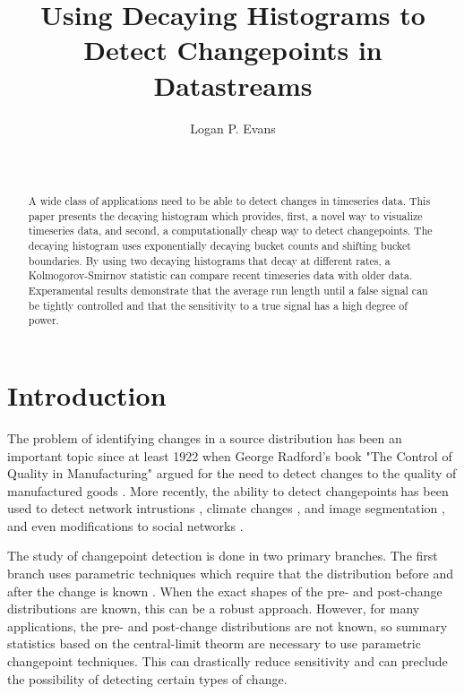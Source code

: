 \documentclass{sigkddExp}
\begin{document}
\title{Using Decaying Histograms to Detect Changepoints in Datastreams}


\author{
\alignauthor Logan P. Evans \\
       \\
       \\
}
\date{}
\maketitle
\begin{abstract}
    A wide class of applications need to be able to detect changes in timeseries
    data. This paper presents the decaying histogram which provides, first, a
    novel way to visualize timeseries data, and second, a computationally cheap
    way to detect changepoints. The decaying histogram uses exponentially
    decaying bucket counts and shifting bucket boundaries. By using two decaying
    histograms that decay at different rates, a Kolmogorov-Smirnov statistic can
    compare recent timeseries data with older data. Experamental results
    demonstrate that the average run length until a false signal can be tightly
    controlled and that the sensitivity to a true signal has a high degree of
    power.
\end{abstract}

\section{Introduction}
    The problem of identifying changes in a source distribution has been an
    important topic since at least 1922 when George Radford's book "The Control
    of Quality in Manufacturing" argued for the need to detect changes to the
    quality of manufactured goods \cite{radford1922control}. More recently, the
    ability to detect changepoints has been used to detect network intrustions
    \cite{tartakovsky2006novel}, climate changes \cite{reeves2007review},
    and image segmentation \cite{ranganathan2010pliss}, and even modifications
    to social networks \cite{mcculloh2011detecting}.

    The study of changepoint detection is done in two primary branches. The
    first branch uses parametric techniques which require that the distribution
    before and after the change is known \cite{polunchenko2012state}. When the
    exact shapes of the pre- and post-change distributions are known, this can
    be a robust approach. However, for many applications, the pre- and
    post-change distributions are not known, so summary statistics based on the
    central-limit theorm are necessary to use parametric changepoint techniques.
    This can drastically reduce sensitivity and can preclude the possibility of
    detecting certain types of change.
\end{document}
